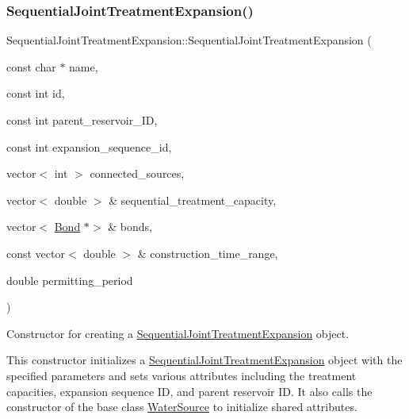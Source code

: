 \subsubsection{\texorpdfstring{Sequential\+Joint\+Treatment\+Expansion()}{SequentialJointTreatmentExpansion()}\hspace{0.1cm}{\footnotesize\ttfamily [1/2]}}
{\footnotesize\ttfamily Sequential\+Joint\+Treatment\+Expansion\+::\+Sequential\+Joint\+Treatment\+Expansion (\begin{DoxyParamCaption}\item[{const char $\ast$}]{name,  }\item[{const int}]{id,  }\item[{const int}]{parent\+\_\+reservoir\+\_\+\+ID,  }\item[{const int}]{expansion\+\_\+sequence\+\_\+id,  }\item[{vector$<$ int $>$}]{connected\+\_\+sources,  }\item[{vector$<$ double $>$ \&}]{sequential\+\_\+treatment\+\_\+capacity,  }\item[{vector$<$ \mbox{\hyperlink{classBond}{Bond}} $\ast$$>$ \&}]{bonds,  }\item[{const vector$<$ double $>$ \&}]{construction\+\_\+time\+\_\+range,  }\item[{double}]{permitting\+\_\+period }\end{DoxyParamCaption})}



Constructor for creating a \mbox{\hyperlink{classSequentialJointTreatmentExpansion}{Sequential\+Joint\+Treatment\+Expansion}} object. 

This constructor initializes a {\ttfamily \mbox{\hyperlink{classSequentialJointTreatmentExpansion}{Sequential\+Joint\+Treatment\+Expansion}}} object with the specified parameters and sets various attributes including the treatment capacities, expansion sequence ID, and parent reservoir ID. It also calls the constructor of the base class {\ttfamily \mbox{\hyperlink{classWaterSource}{Water\+Source}}} to initialize shared attributes.


